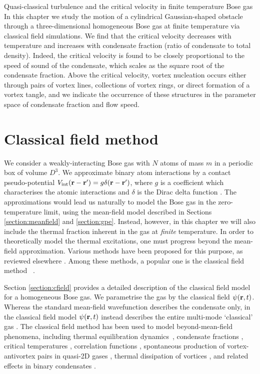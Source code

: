 \begin{chapter}{\label{cha:nonequib}Quasi-classical turbulence and the critical velocity in finite temperature Bose gas}
In this chapter we study the motion of a cylindrical Gaussian-shaped
obstacle through a three-dimensional homogeneous Bose gas at finite
temperature via classical field simulations. We
find that the critical velocity decreases with temperature and
increases with condensate fraction (ratio of condensate to total density).
Indeed, the critical velocity is found to be closely proportional
to the speed of sound of the condensate, which scales as the square
root of the condensate fraction. Above
the critical velocity, vortex nucleation occurs either through
pairs of vortex lines, collections of vortex rings, or direct formation of a vortex tangle, and we indicate the occurrence of these structures in the parameter space of condensate fraction and flow speed.

  \section{Classical field method}
\label{sec:theory}

We consider a weakly-interacting Bose gas with $N$ atoms of mass $m$ in a periodic box of volume $D^3$.  We approximate binary atom interactions by a contact pseudo-potential $V_{\mathrm{int}}({\bf r}-{\bf r'})= g \delta({\bf r}-{\bf r'})$, where $g$ is a coefficient which characterises the atomic interactions and $\delta$ is the Dirac delta function \cite{Pethick}. The approximations would lead us naturally to model the Bose gas in the zero-temperature limit, using the mean-field model described in Sections \ref{section:meanfield} and \ref{section:gpe}. Instead, however, in this chapter we will also include the thermal fraction inherent in the gas at {\it finite} temperature. In order to theoretically model the thermal excitations, one must progress beyond the mean-field approximation.
Various methods have been proposed for this purpose, as reviewed elsewhere
\cite{Pol_Rev,Proukakis,griffin2009bose,finite_temp_book,Blakie,berloff_2014}.
Among these methods, a popular one is the classical field method ~\cite{Svis5,Davis,PRL.87.210404,
PhysRevA.66.013603,Davis2,PhysRevLett.95.263901,Pol_Rev}.

Section \ref{section:cfield} provides a detailed description of the classical field model for a homogeneous Bose gas. We parametrise the gas by the classical field $\psi({\bf r},t)$. Whereas the standard mean-field wavefunction describes the condensate only, in the classical field model $\psi({\bf r},t)$ instead describes the entire multi-mode `classical' gas \cite{Proukakis,Blakie}.  The classical field method has been used to model beyond-mean-field phenomena, including thermal equilibration dynamics~\cite{PhysRevA.66.013603,PhysRevLett.95.263901,pattinson_2014,nazarenko_2014}, condensate fractions \cite{Davis}, critical temperatures \cite{Davis2006}, correlation functions \cite{Wright2011}, spontaneous production of vortex-antivortex pairs in quasi-2D gases \cite{Simula}, thermal dissipation of vortices \cite{berloff_2007},  and related effects in binary condensates \cite{Berloff_2006,Salman20091482,pattinson_2014}.


\end{chapter}
